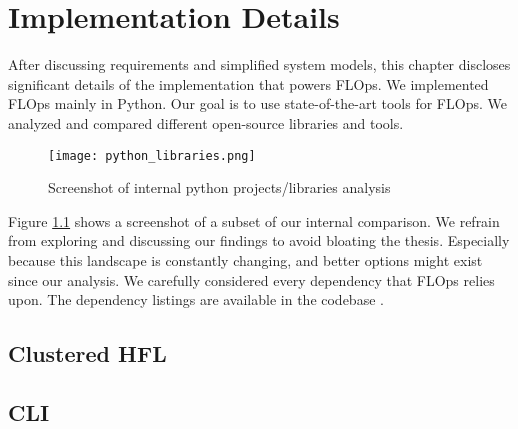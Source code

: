 \chapter{Implementation Details}

After discussing requirements and simplified system models, this chapter discloses significant details of the implementation that powers FLOps.
We implemented FLOps mainly in Python.
Our goal is to use state-of-the-art tools for FLOps.
We analyzed and compared different open-source libraries and tools.

\begin{figure}[h]
    \begin{adjustwidth}{-0.175\paperwidth}{-0.175\paperwidth}
        \centering
        \texttt{[image: python\_libraries.png]}
        \caption{Screenshot of internal python projects/libraries analysis}
        \label{fig:python_projects_libraries}
    \end{adjustwidth}
\end{figure}

Figure \ref{fig:python_projects_libraries} shows a screenshot of a subset of our internal comparison.
We refrain from exploring and discussing our findings to avoid bloating the thesis.
Especially because this landscape is constantly changing, and better options might exist since our analysis. 
We carefully considered every dependency that FLOps relies upon.
The dependency listings are available in the codebase \cite{flops_code}.









\section{Clustered HFL}

\section{CLI}

